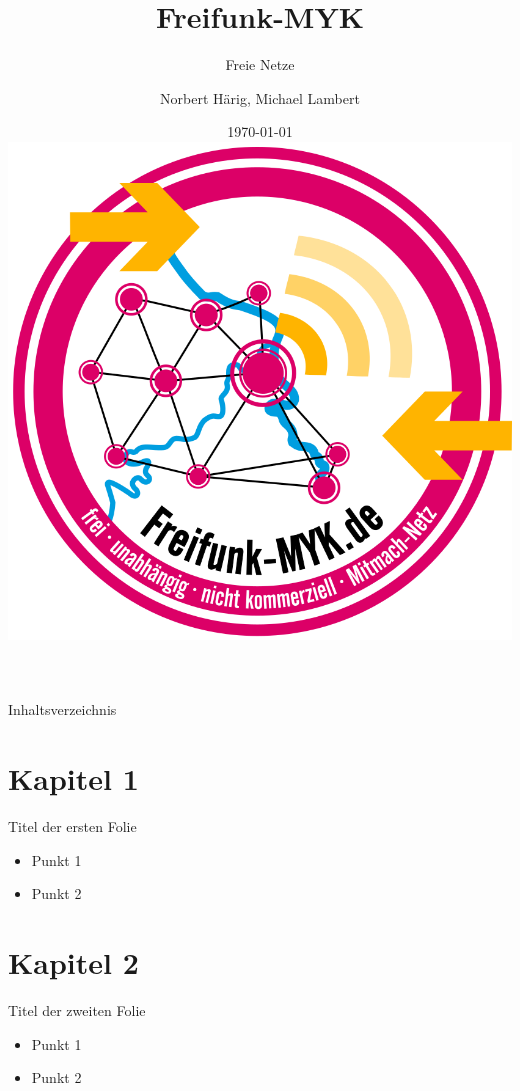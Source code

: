 \documentclass{beamer}
\begin{document}
\title[Freie Netzer]{Freifunk-MYK}
\subtitle[Freifunk-MYK]{Freie Netze}
\author[Freifunk-MYK]{Norbert Härig, Michael Lambert}
\date{\today\\\vspace{0.5cm} \includegraphics[scale=0.1]{Bilder/Logo.png}}
\institute{}

\begin{frame}
\titlepage	
\end{frame}
\begin{frame}{Inhaltsverzeichnis}
	\tableofcontents
\end{frame}
\section{Kapitel 1}
\begin{frame}{Titel der ersten Folie}
\begin{itemize}
	\item Punkt 1
	\item Punkt 2
\end{itemize}
\end{frame}
\section{Kapitel 2}
\begin{frame}{Titel der zweiten Folie}
	\begin{itemize}
		\item Punkt 1
		\item Punkt 2
	\end{itemize}
\end{frame}
\end{document}
